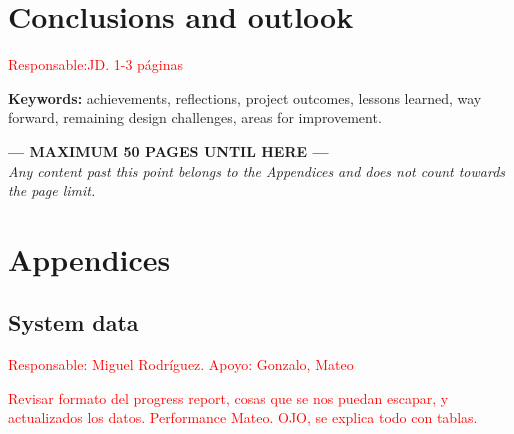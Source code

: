 \documentclass[11pt, a4paper]{article} %
\begin{document}
\section{Conclusions and outlook} \textcolor{red}{Responsable:JD. 1-3 páginas}

\vspace{0.5cm}
\noindent\textbf{Keywords:} achievements, reflections, project outcomes, lessons learned, way forward, remaining design challenges, areas for improvement.

\newpage
\vspace*{5cm}
\begin{center}
    \Huge \textbf{\textcolor{EtseNavy}{--- MAXIMUM 50 PAGES UNTIL HERE ---}} \\
    \vspace{1cm}
    \Large \textit{Any content past this point belongs to the Appendices and does not count towards the page limit.}
\end{center}
\newpage

\section{Appendices}

\subsection{System data} \textcolor{red}{Responsable: Miguel Rodríguez. Apoyo: Gonzalo, Mateo}

\vspace{1cm}

\textcolor{red}{Revisar formato del progress report, cosas que se nos puedan escapar, y actualizados los datos. Performance Mateo. OJO, se explica todo con tablas.}
\end{document}
